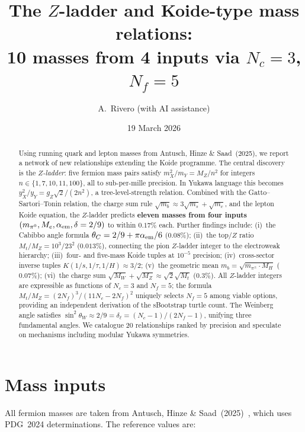 \documentclass[11pt]{article}
\title{The $Z$-ladder and Koide-type mass relations: \\
  10 masses from 4 inputs via $N_c=3$, $N_f=5$}
\author{A.~Rivero (with AI assistance)}
\date{19 March 2026}
\begin{document}
\maketitle

\begin{abstract}
Using running quark and lepton masses from Antusch, Hinze \&
Saad~(2025), we report a network of new relationships extending
the Koide programme.  The central discovery is the \emph{$Z$-ladder}:
five fermion mass pairs satisfy $m_X^2/m_Y = M_Z/n^2$ for integers
$n \in \{1,7,10,11,100\}$, all to sub-per-mille precision.
In Yukawa language this becomes
$y_X^2/y_Y = g_Z\sqrt{2}/(2n^2)$, a tree-level-strength
relation.  Combined with the Gatto--Sartori--Tonin relation,
the charge sum rule $\sqrt{m_b}\approx 3\sqrt{m_s}+\sqrt{m_c}$,
and the lepton Koide equation, the $Z$-ladder predicts
\textbf{eleven masses from four inputs}
$(m_{\pi^0},M_e,\alpha_{\rm em},\delta=2/9)$ to within $0.17\%$ each.
Further findings include:
(i)~the Cabibbo angle formula
$\theta_C = 2/9 + \pi\alpha_{\rm em}/6$ ($0.08\%$);
(ii)~the top/$Z$ ratio $M_t/M_Z = 10^3/23^2$ ($0.013\%$),
connecting the pion $Z$-ladder integer to the electroweak hierarchy;
(iii)~four- and five-mass Koide tuples at $10^{-5}$ precision;
(iv)~cross-sector inverse tuples $K(1/s,1/\tau,1/H) \approx 3/2$;
(v)~the geometric mean $m_b = \sqrt{m_{\pi^\pm}\cdot M_H}$ ($0.07\%$);
(vi)~the charge sum $\sqrt{M_W}+\sqrt{M_Z}\approx
\sqrt{2}\sqrt{M_t}$ ($0.3\%$).
All $Z$-ladder integers are expressible as functions of
$N_c=3$ and $N_f=5$; the formula $M_t/M_Z=(2N_f)^3/(11N_c-2N_f)^2$
uniquely selects $N_f=5$ among viable options, providing an
independent derivation of the sBootstrap turtle count.
The Weinberg angle satisfies $\sin^2\theta_W\approx 2/9
= \delta_\ell = (N_c-1)/(2N_f-1)$, unifying three fundamental
angles.  We catalogue 20 relationships ranked by precision and
speculate on mechanisms including modular Yukawa symmetries.
\end{abstract}

\section{Mass inputs}

All fermion masses are taken from Antusch, Hinze \&
Saad~(2025)~\cite{AHS2025}, which uses PDG~2024 determinations.
The reference values are:
\end{document}

